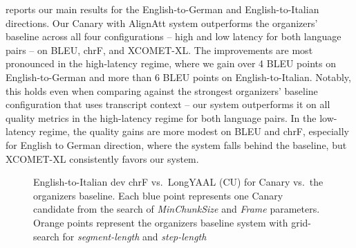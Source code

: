 \documentclass[11pt]{article}
\begin{document}
 reports our main results for the English-to-German and English-to-Italian directions. Our Canary with AlignAtt system outperforms the organizers' baseline across all four configurations -- high and low latency for both language pairs -- on BLEU, chrF, and XCOMET-XL. The improvements are most pronounced in the high-latency regime, where we gain over 4 BLEU points on English-to-German and more than 6 BLEU points on English-to-Italian. Notably, this holds even when comparing against the strongest organizers' baseline configuration that uses transcript context -- our system outperforms it on all quality metrics in the high-latency regime for both language pairs. In the low-latency regime, the quality gains are more modest on BLEU and chrF, especially for English to German direction, where the system falls behind the baseline, but XCOMET-XL consistently favors our system.

\begin{figure}[t]
    \caption{English-to-Italian dev chrF vs.\ LongYAAL (CU) for Canary vs.\ the organizers baseline. Each blue point represents one Canary candidate from the search of \textit{MinChunkSize} and \textit{Frame} parameters. Orange points represent the organizers baseline system with grid-search for \textit{segment-length} and \textit{step-length}} 
    \label{fig:canary-baseline-enit}
\end{figure}
\end{document}
